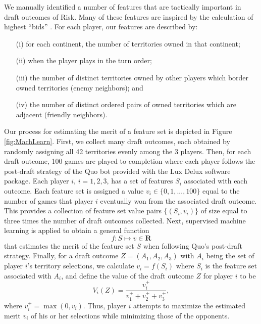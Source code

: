 \documentclass[letterpaper]{article}
\numberwithin{equation}{section}
\numberwithin{theorem}{section}
\numberwithin{lemma}{section}
\numberwithin{df}{section}
\begin{document}
We manually identified a number of features that are tactically important in draft outcomes of Risk.  Many of these features are inspired by the calculation of highest ``bids'' \cite{RiskBots}.  For each player, our features are described by: 
\begin{itemize}
\item[(i)] for each continent, the number of territories owned in that continent; \item[(ii)] when the player plays in the turn order; \item[(iii)] the number of distinct territories owned by other players which border owned territories (enemy neighbors); and \item[(iv)] the number of distinct ordered pairs of owned territories which are adjacent (friendly neighbors).
\end{itemize}  Our process for estimating the merit of a feature set is depicted in Figure \ref{fig:MachLearn}.  First, we collect many draft outcomes, each obtained by randomly assigning all 42 territories evenly among the 3 players.  Then, for each draft outcome, 100 games are played to completion where each player follows the post-draft strategy of the Quo bot provided with the Lux Delux software package.  Each player $i$, $i=1,2,3$, has a set of features $S_i$ associated with each outcome.  Each feature set is assigned a value $v_i \in \{0,1,...,100\}$ equal to the number of games that player $i$ eventually won from the associated draft outcome.  This provides a collection of feature set value pairs $\{(S_i, v_i)\}$ of size equal to three times the number of draft outcomes collected.  Next, supervised machine learning is applied to obtain a general function
\[ f: S \mapsto v \in \textbf{R} \] 
that estimates the merit of the feature set $S$ when following Quo's post-draft strategy.  Finally, for a draft outcome $Z = (A_1,A_2,A_3)$ with $A_i$ being the set of player $i$'s territory selections, we calculate $v_i = f(S_i)$ where $S_i$ is the feature set associated with $A_i$, and define the value of the draft outcome $Z$ for player $i$ to be
\[ V_i(Z) = \frac{v_i^+}{v_1^+ + v_2^+ + v_3^+}, \]
where $v_i^+ = \max(0, v_i)$.  
Thus, player $i$ attempts to maximize the estimated merit $v_i$ of his or her selections while minimizing those of the opponents.
\end{document}
